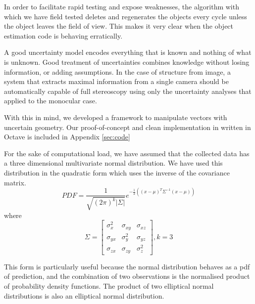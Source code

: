 \documentclass[a4paper, 11pt, titlepage]{article}
\newcounter{subsubsubsection}[subsubsection]
\begin{document}
        In order to facilitate rapid testing and expose weaknesses, the algorithm with which we have field tested deletes and regenerates the objects every cycle unless the object leaves the field of view.  This makes it very clear when the object estimation code is behaving erratically.

        \label{sec:UncertaintyAnalysis}

        A good uncertainty model encodes everything that is known and nothing of what is unknown.  Good treatment of uncertainties combines knowledge without losing information, or adding assumptions.
        In the case of structure from image, a system that extracts maximal information from a single camera should be automatically capable of full stereoscopy using only the uncertainty analyses that applied to the monocular case.

        With this in mind, we developed a framework to manipulate vectors with uncertain geometry.
        Our proof-of-concept and clean implementation in written in Octave is included in Appendix \ref{sec:code}

        For the sake of computational load, we have assumed that the collected data has a three dimensional multivariate normal distribution.  We have used this distribution in the quadratic form which uses the inverse of the covariance matrix.
        \begin{equation}
        PDF = \frac{1}{\sqrt {(2\pi)^k|\Sigma|}} e^{-\frac{1}{2}\left( \left(x-\mu\right)^T \Sigma^{-1} \left(x-\mu\right) \right)}
        \end{equation}
        where
        \begin{equation}
        \Sigma=\begin{bmatrix}
          \sigma_x^2 & \sigma_{xy} & \sigma_{xz} \\[0.3em]
          \sigma_{yx} & \sigma_y^2 & \sigma_{yz} \\[0.3em]
          \sigma_{zx} & \sigma_{zy} & \sigma_z^2 
        \end{bmatrix}, k=3
        \end{equation}

        This form is particularly useful because the normal distribution behaves as a \gls{pdf} of prediction, and the combination of two observations is the normalised product of probability density functions.  The product of two elliptical normal distributions is also an elliptical normal distribution.  
\end{document}
